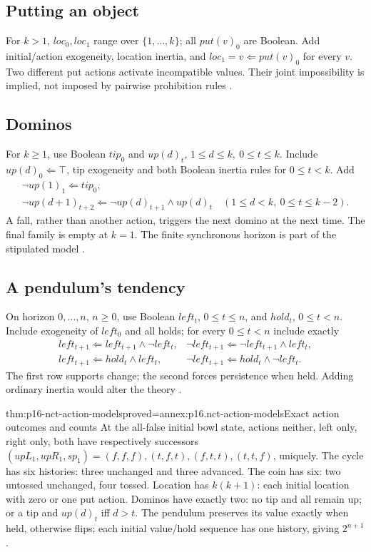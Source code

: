 \subsection{Putting an object}
For \(k>1\), \(loc_0,loc_1\) range over \(\{1,\ldots,k\}\);
all \(put(v)_0\) are Boolean. Add initial/action exogeneity, location inertia,
and \(loc_1=v\Leftarrow put(v)_0\) for every \(v\).
Two different put actions activate incompatible values. Their joint
impossibility is implied, not imposed by pairwise prohibition rules
\cite[pp.~768--769]{Turner2008NonmonotonicCausalLogic}.

\subsection{Dominos}
For \(k\geq1\), use Boolean \(tip_0\) and \(up(d)_t\),
\(1\leq d\leq k,\ 0\leq t\leq k\).
Include \(up(d)_0\Leftarrow\top\), tip exogeneity and both Boolean
inertia rules for \(0\leq t<k\). Add
\[
\begin{gathered}
 \neg up(1)_1\Leftarrow tip_0,\\
 \neg up(d+1)_{t+2}\Leftarrow\neg up(d)_{t+1}\land up(d)_t
       \quad(1\leq d<k,\ 0\leq t\leq k-2).
\end{gathered}
\]
A fall, rather than another action, triggers the next domino at the next
time. The final family is empty at \(k=1\).
The finite synchronous horizon is part of the stipulated model
\cite[p.~769]{Turner2008NonmonotonicCausalLogic}.

\subsection{A pendulum's tendency}
On horizon \(0,\ldots,n\), \(n\geq0\), use Boolean \(left_t\),
\(0\leq t\leq n\), and \(hold_t\), \(0\leq t<n\).
Include exogeneity of \(left_0\) and all holds;
for every \(0\leq t<n\) include exactly
\[
\begin{array}{ll}
 left_{t+1}\Leftarrow left_{t+1}\land\neg left_t,&
 \neg left_{t+1}\Leftarrow\neg left_{t+1}\land left_t,\\
 left_{t+1}\Leftarrow hold_t\land left_t,&
 \neg left_{t+1}\Leftarrow hold_t\land\neg left_t.
\end{array}
\]
The first row supports change; the second forces persistence when held.
Adding ordinary inertia would alter the theory
\cite[p.~770]{Turner2008NonmonotonicCausalLogic}.

\begin{hbtheorem}{thm:p16-nct-action-models}{proved=annex:p16.nct-action-models}{Exact action outcomes and counts}
At the all-false initial bowl state, actions neither, left only, right only,
both have respectively successors
\((upL_1,upR_1,sp_1)=(f,f,f),(t,f,t),(f,t,t),(t,t,f)\), uniquely.
The cycle has six histories: three unchanged and three advanced.
The coin has six: two untossed unchanged, four tossed.
Location has \(k(k+1)\): each initial location with zero or one put action.
Dominos have exactly two: no tip and all remain up; or a tip and
\(up(d)_t\) iff \(d>t\).
The pendulum preserves its value exactly when held, otherwise flips;
each initial value/hold sequence has one history, giving \(2^{n+1}\).
\end{hbtheorem}

